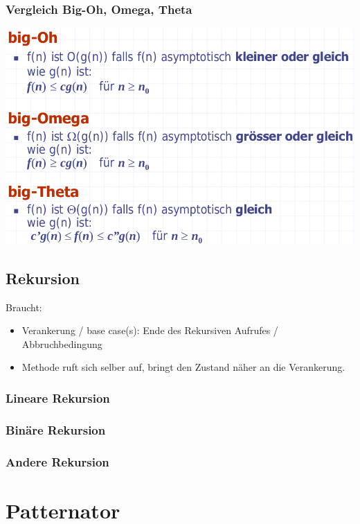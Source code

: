 \subsubsection{Vergleich Big-Oh, Omega, Theta}

\includegraphics[scale=0.3]{img/big-oh-vergleich.png}

\subsection{Rekursion}

Braucht:
\begin{itemize}
	\item Verankerung / base case(s): Ende des Rekursiven Aufrufes / Abbruchbedingung
	\item Methode ruft sich selber auf, bringt den Zustand näher an die Verankerung.
\end{itemize}

\subsubsection{Lineare Rekursion}

\subsubsection{Binäre Rekursion}

\subsubsection{Andere Rekursion}



\section{Patternator}


